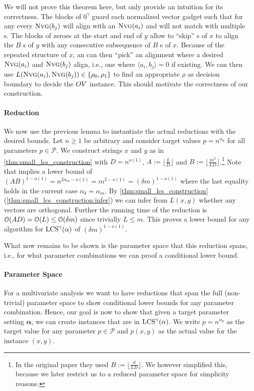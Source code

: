 We will not prove this theorem here, but only provide an intuition for its correctness.
The blocks of $0^\gamma$ guard each normalized vector gadget such that for any \lcs{} every $\text{\textsc{Nvg}}(b_j)$ will align with an $\text{\textsc{Nvg}}(a_i)$ and will not match with multiple \nvgName{}s.
The blocks of zeroes at the start and end of $y$ allow to \enquote{skip} \nvgName{}s of $x$ to align the $B$ \nvgName{}s of $y$ with any consecutive subsequence of $B$ \nvgName{}s of $x$.
Because of the repeated structure of $x$, an \lcs{} can then \enquote{pick} an alignment where a desired $\text{\textsc{Nvg}}(a_i)$ and $\text{\textsc{Nvg}}(b_j)$ align, i.e., one where $\langle a_i, b_j \rangle = 0$ if existing.
We can then use $L(\text{\textsc{Nvg}}(a_i), \text{\textsc{Nvg}}(b_j)) \in \{\rho_0, \rho_1\}$ to find an appropriate $\rho$ as decision boundary to decide the $OV$ instance.
This should motivate the correctness of our construction.


\paragraph*{Reduction}
We now use the previous lemma to instantiate the actual reductions with the desired bounds.
Let $n \geq 1$ be arbitrary and consider target values $p = n^{\alpha_p}$ for all parameters $p \in \mathcal{P}$.
We construct strings $x$ and $y$ as in \autoref{thm:small_lcs_construction} with $D = n^{o(1)}$, $A := \lfloor \frac{L}{D} \rfloor$ and $B := \lfloor \frac{m^2}{LD} \rfloor$.\footnote{In the original paper they used $B := \lfloor \frac{d}{LD} \rfloor$. We however simplified this, because we later restrict us to a reduced parameter space for simplicity reasons.}
Note that \uovh{} implies a lower bound of $(AB)^{1-o(1)} = n^{2\alpha_m - o(1)} = m^{2 - o(1)} = (\delta m)^{1-o(1)}$ where the last equality holds in the current case $\alpha_\delta = \alpha_m$.
By \autoref{thm:small_lcs_construction} (\ref{thm:small_lcs_construction:infer}) we can infer from $L(x,y)$ whether any vectors are orthogonal.
Further the running time of the reduction is $\mathcal{O}(AD) = \mathcal{O}(L) \leq \mathcal{O}(\delta m)$ since trivially $L \leq m$.
This proves a lower bound for any algorithm for $\text{LCS}^\gamma(\mathbb{\alpha})$ of $(\delta m)^{1-o(1)}$.


What now remains to be shown is the parameter space that this reduction spans, i.e., for what \lcs{} parameter combinations we can proof a conditional lower bound.



\paragraph*{Parameter Space}
For a multivariate analysis we want to have reductions that span the full (non-trivial) parameter space to show conditional lower bounds for any parameter combination.
Hence, our goal is now to show that given a target parameter setting $\mathbf{\alpha}$, we can create instances that are in $\text{LCS}^\gamma(\mathbf{\alpha})$.
We write $p = n^{\alpha_p}$ as the target value for any parameter $p \in \mathcal{P}$ and $p(x,y)$ as the actual value for the \lcs{} instance $(x,y)$.

